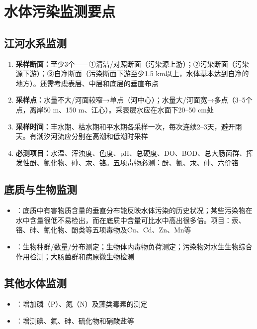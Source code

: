 \documentclass[10pt,a4paper,oneside]{ctexbook}
\begin{document}
\section{水体污染监测要点}

\subsection{江河水系监测}
\begin{enumerate}[leftmargin=*]
    \item \textbf{采样断面：}至少3个——①清洁/对照断面（污染源上游）；②污染断面（污染源下游）；③自净断面（污染断面下游至少1.5 km以上，水体基本达到自净的地方）。还需考虑表层、中层和底层的垂直布点
    \item \textbf{采样点：}水量不大/河面较窄→单点（河中心）；水量大/河面宽→多点（3--5个点，离岸50 m、150 m、江心）。采表层水应在水面下20--50 cm处
    \item \textbf{采样时间：}丰水期、枯水期和平水期各采样一次，每次连续2--3天，避开雨天。有潮汐河流应分别在高潮和低潮时采样
    \item \textbf{必测项目：}水温、浑浊度、色度、pH、总硬度、DO、BOD、总大肠菌群、挥发性酚、氰化物、砷、汞、铬。五项毒物必测：酚、氰、汞、砷、六价铬
\end{enumerate}

\subsection{底质与生物监测}
\begin{itemize}[leftmargin=*]
    \item {}：底质中有害物质含量的垂直分布能反映水体污染的历史状况；某些污染物在水中含量很低不易检出，而在底质中含量可比水中高出很多倍。项目：汞、铬、砷、氰化物、酚类等五项毒物及Cu、Cd、Zn、Mn等
    \item {}：生物种群/数量/分布测定；生物体内毒物负荷测定；污染物对水生生物综合作用检测；大肠菌群和病原微生物检测
\end{itemize}

\subsection{其他水体监测}
\begin{itemize}[leftmargin=*]
    \item {}：增加磷（P）、氮（N）及藻类毒素的测定
    \item {}：增测碘、氟、砷、硫化物和硝酸盐等
\end{itemize}
\end{document}
